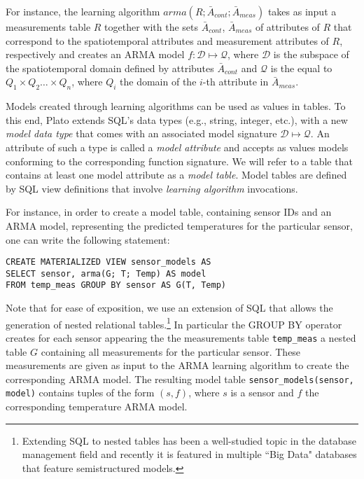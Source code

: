\vspace*{0.5cm}
\begin{example}
For instance, the learning algorithm $arma(R;{\bar{A}_{cont}}; \bar{A}_{meas})$ takes as input a measurements table $R$ together with the sets $\bar{A}_{cont}$, $\bar{A}_{meas}$ of attributes of $R$ that correspond to the spatiotemporal attributes and measurement attributes of $R$, respectively and creates an ARMA model $f:\mathcal{D}\mapsto\mathcal{Q}$, where $\mathcal{D}$ is the subspace of the spatiotemporal domain defined by attributes $\bar{A}_{cont}$ and $\mathcal{Q}$ is the equal to $Q_1 \times Q_2 \ldots \times Q_n$, where $Q_i$ the domain of the $i$-th attribute in $\bar{A}_{meas}$. 
\end{example}  
\vspace*{0.5cm}

Models created through learning algorithms can be used as values in tables. To this end, Plato extends SQL's data types (e.g., string, integer, etc.), with a new {\em model data type} that comes with an associated model signature $\mathcal{D}\mapsto \mathcal{Q}$. An attribute of such a type is called a {\em model attribute} and accepts as values models conforming to the corresponding function signature. We will refer to a table that contains at least one model attribute as a {\em model table}. Model tables are defined by SQL view definitions that involve {\em learning algorithm} invocations. 

\vspace*{0.5cm}
\begin{example}
\label{xmpl:models-and-definitions}
For instance, in order to create a model table, containing sensor IDs and an ARMA model, representing the predicted temperatures for the particular sensor, one can write the following statement:

\begin{verbatim}
CREATE MATERIALIZED VIEW sensor_models AS 
SELECT sensor, arma(G; T; Temp) AS model
FROM temp_meas GROUP BY sensor AS G(T, Temp)
\end{verbatim}

Note that for ease of exposition, we use an extension of SQL that allows the generation of nested relational tables.\footnote{Extending SQL to nested tables has been a well-studied topic in the database management field and recently it is featured in multiple ``Big Data" databases that feature semistructured models. 
}
In particular the GROUP BY operator creates for each sensor appearing the the measurements table \texttt{temp\_meas} a nested table $G$ containing all measurements for the particular sensor. These measurements are given as input to the ARMA learning algorithm to create the corresponding ARMA model.
The resulting model table \texttt{sensor\_models(sensor, model)} contains tuples of the form $(s, f)$, where $s$ is a sensor and $f$ the corresponding temperature ARMA model.
\end{example}
\vspace*{0.5cm}


